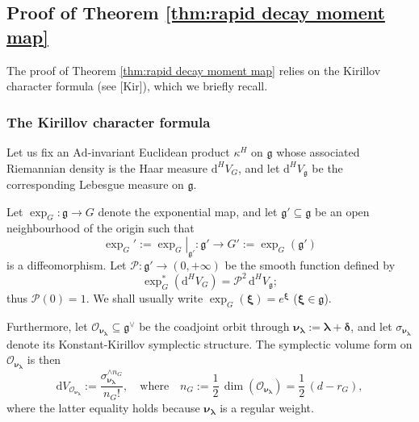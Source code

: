 \documentclass[12pt,a4paper]{article}
\theoremstyle{plain}
\theoremstyle{definition}
\begin{document}
\subsection{Proof of Theorem \ref{thm:rapid decay moment map}}

The proof of Theorem \ref{thm:rapid decay moment map}
relies on the Kirillov character formula (see [Kir]), which we briefly recall.


\subsubsection{The Kirillov character formula}
\label{sctn:kircharform}


Let us fix an $\mathrm{Ad}$-invariant Euclidean product
$\kappa^H$ on
$\mathfrak{g}$ whose associated Riemannian density is
the Haar measure $\mathrm{d}^HV_G$, and
let $\mathrm{d}^HV_{\mathfrak{g}}$ be the corresponding
Lebesgue measure on $\mathfrak{g}$.

Let $\exp_G:\mathfrak{g}\rightarrow G$ denote the exponential
map, and let $\mathfrak{g}'\subseteq \mathfrak{g}$
be an open neighbourhood of the origin such that
\begin{equation}
\label{eqn:restriction exp G'}
\exp_G':=
\left.\exp_G\right|_{\mathfrak{g}'}:\mathfrak{g}'\rightarrow G':=\exp_G(\mathfrak{g}')
\end{equation}
is a diffeomorphism. 
Let $\mathcal{P}:\mathfrak{g}'\rightarrow (0,+\infty)$ 
be the smooth function 
defined by
\begin{equation}
\label{eqn:defn P^2}
\exp_G^*\left(\mathrm{d}^HV_G\right)=
\mathcal{P}^2\,\mathrm{d}^HV_{\mathfrak{g}};
\end{equation}
%
thus $\mathcal{P}(0)=1$. We shall usually write
$\exp_G(\boldsymbol{\xi})=e^{\boldsymbol{\xi}}$
($\boldsymbol{\xi}\in \mathfrak{g}$).

Furthermore, let 
$\mathcal{O}_{\boldsymbol{\nu}_{\boldsymbol{\lambda}}}
\subseteq \mathfrak{g}^\vee$
be the coadjoint orbit through $\boldsymbol{\nu}_{\boldsymbol{\lambda}}:=\boldsymbol{\lambda}+
\boldsymbol{\delta}$, and let $\sigma_{\boldsymbol{\nu}_{\boldsymbol{\lambda}}}$ denote its Konstant-Kirillov 
symplectic structure. The symplectic volume form on
$\mathcal{O}_{\boldsymbol{\nu}_{\boldsymbol{\lambda}}}$
is then 
$$
\mathrm{d}
V_{\mathcal{O}_{\boldsymbol{\nu}_{\boldsymbol{\lambda}}}}
:=
\frac{\sigma_{\boldsymbol{\nu}_{\boldsymbol{\lambda}}}
^{\wedge n_G}}{n_G!},
\quad \text{where}\quad
n_G:=\frac{1}{2}\,\dim(\mathcal{O}_{\boldsymbol{\nu}_{\boldsymbol{\lambda}}})=\frac{1}{2}\,
(d-r_G),
$$
where the latter equality holds because 
$\boldsymbol{\nu}_{\boldsymbol{\lambda}}$ is a regular weight.
\end{document}
